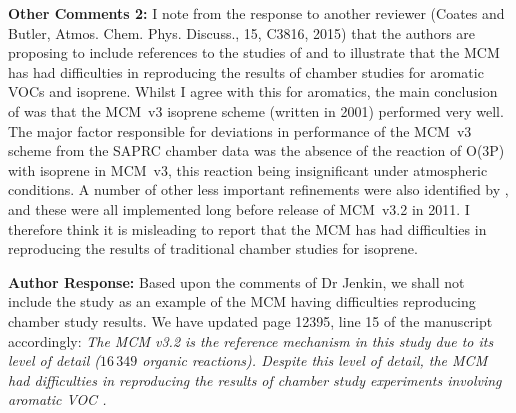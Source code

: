 \documentclass{article}
\begin{document}
\textbf{Other Comments 2:} I note from the response to another reviewer (Coates and Butler, Atmos. Chem.  Phys. Discuss., 15, C3816, 2015) that the authors are proposing to include references to the studies of \citet{Bloss:2005} and \citet{Pinho:2005} to illustrate that the MCM has had difficulties in reproducing the results of chamber studies for aromatic VOCs and isoprene. Whilst I agree with this for aromatics, the main conclusion of \citet{Pinho:2005} was that the MCM~v3 isoprene scheme (written in 2001) performed very well. The major factor responsible for deviations in performance of the MCM~v3 scheme from the SAPRC chamber data was the absence of the reaction of O(3P) with isoprene in MCM~v3, this reaction being insignificant under atmospheric conditions. A number of other less important refinements were also identified by \citet{Pinho:2005}, and these were all implemented long before release of MCM~v3.2 in 2011. I therefore think it is misleading to report that the MCM has had difficulties in reproducing the results of traditional chamber studies for isoprene. 

\textbf{Author Response:} Based upon the comments of Dr Jenkin, we shall not include the \citet{Pinho:2005} study as an example of the MCM having difficulties reproducing chamber study results.
We have updated page 12395, line 15 of the manuscript accordingly: \textit{The MCM v3.2 is the reference mechanism in this study due to its level of detail ($16\,349$ organic reactions). Despite this level of detail, the MCM had difficulties in reproducing the results of chamber study experiments involving aromatic VOC \citep{Bloss:2005}.}
\end{document}
